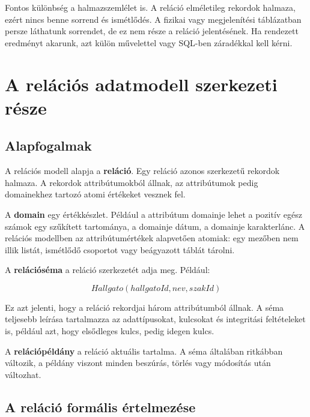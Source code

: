 Fontos különbség a halmazszemlélet is. A reláció elméletileg rekordok halmaza, ezért nincs benne sorrend és ismétlődés. A fizikai vagy megjelenítési táblázatban persze láthatunk sorrendet, de ez nem része a reláció jelentésének. Ha rendezett eredményt akarunk, azt külön művelettel vagy SQL-ben  záradékkal kell kérni.

\section{A relációs adatmodell szerkezeti része}

\subsection{Alapfogalmak}

A relációs modell alapja a \textbf{reláció}. Egy reláció azonos szerkezetű rekordok halmaza. A rekordok attribútumokból állnak, az attribútumok pedig domainekhez tartozó atomi értékeket vesznek fel.

\begin{center}

\end{center}

A \textbf{domain} egy értékkészlet. Például a  attribútum domainje lehet a pozitív egész számok egy szűkített tartománya, a  domainje dátum, a  domainje karakterlánc. A relációs modellben az attribútumértékek alapvetően atomiak: egy mezőben nem illik listát, ismétlődő csoportot vagy beágyazott táblát tárolni.

A \textbf{relációséma} a reláció szerkezetét adja meg. Például:

\[
  Hallgato(hallgatoId, nev, szakId)
\]

Ez azt jelenti, hogy a  reláció rekordjai három attribútumból állnak. A séma teljesebb leírása tartalmazza az adattípusokat, kulcsokat és integritási feltételeket is, például azt, hogy  elsődleges kulcs,  pedig idegen kulcs.

A \textbf{relációpéldány} a reláció aktuális tartalma. A séma általában ritkábban változik, a példány viszont minden beszúrás, törlés vagy módosítás után változhat.

\subsection{A reláció formális értelmezése}

